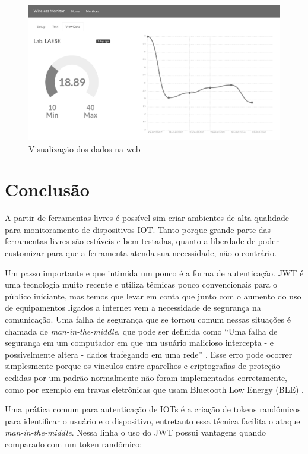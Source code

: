 \begin{figure}[h]
    \centering
    \includegraphics[scale=0.35]{img/temperature-show-grey.png}
    \caption{Visualização dos dados na web} \label{fig:view-monitor}
\end{figure}

\section{Conclusão}\label{conclusuxe3o}

A partir de ferramentas livres é possível sim criar ambientes de alta
qualidade para monitoramento de dispositivos IOT. Tanto porque grande
parte das ferramentas livres são estáveis e bem testadas, quanto a
liberdade de poder customizar para que a ferramenta atenda sua
necessidade, não o contrário.

Um passo importante e que intimida um pouco é a forma de autenticação.
JWT é uma tecnologia muito recente e utiliza técnicas pouco
convencionais para o público iniciante, mas temos que levar em conta que
junto com o aumento do uso de equipamentos ligados a internet vem a
necessidade de segurança na comunicação. Uma falha de segurança que se
tornou comum nessas situações é chamada de \emph{man-in-the-middle}, que
pode ser definida como ``Uma falha de segurança em um computador em que
um usuário malicioso intercepta - e possivelmente altera - dados
trafegando em uma rede'' \cite{wordspy:2002}. Esse erro pode ocorrer
simplesmente porque os vínculos entre aparelhos e criptografias de
proteção cedidas por um padrão normalmente não foram implementadas
corretamente, como por exemplo em travas eletrônicas que usam Bluetooth
Low Energy (BLE) \cite{spring:2016}.

Uma prática comum para autenticação de IOTs é a criação de tokens
randômicos para identificar o usuário e o dispositivo, entretanto essa
técnica facilita o ataque \emph{man-in-the-middle}. Nessa linha o uso do
JWT possui vantagens quando comparado com um token randômico:

